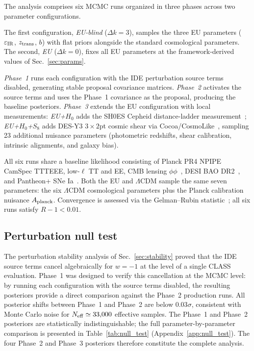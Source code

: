 \documentclass[a4paper,fleqn]{cas-dc}
\newcommand{\ztrans}{z_{\rm trans}}
\begin{document}
The analysis comprises six MCMC runs organized in three
phases across two parameter configurations.

The first configuration, \textit{EU-blind} ($\Delta k = 3$),
samples the three EU parameters
($\varepsilon_{\rm IR}$, $\ztrans$, $b$) with flat priors
alongside the standard cosmological parameters. The second,
\textit{EU} ($\Delta k = 0$), fixes all EU parameters at
the framework-derived values of Sec.~\ref{sec:params}.

\textit{Phase~1} runs each configuration with the IDE
perturbation source terms disabled, generating stable
proposal covariance matrices.
\textit{Phase~2} activates the source terms and uses the
Phase~1 covariance as the proposal, producing the baseline
posteriors.
\textit{Phase~3} extends the EU configuration with local
measurements:
\textit{EU+$H_0$} adds the SH0ES Cepheid distance-ladder
measurement~\cite{breuval2024};
\textit{EU+$H_0$+$S_8$} adds DES-Y3
$3 \times 2$pt cosmic shear via
Cocoa/CosmoLike~\cite{des2022,krause2021}, sampling 23
additional nuisance parameters (photometric redshifts,
shear calibration, intrinsic alignments, and galaxy bias).

All six runs share a baseline likelihood consisting of
Planck PR4 NPIPE CamSpec TTTEEE, low-$\ell$ TT and EE,
CMB lensing
$\phi\phi$~\cite{planck2020npipe}, DESI BAO
DR2~\cite{desi_dr2_2025}, and Pantheon+ SNe
Ia~\cite{scolnic2022}. Both the EU and $\Lambda$CDM
sample the same seven parameters: the six
$\Lambda$CDM cosmological parameters plus the Planck
calibration nuisance $A_{\rm planck}$.
Convergence is assessed via the Gelman--Rubin
statistic~\cite{gelman1992}; all six runs satisfy
$R-1 < 0.01$.

\subsection{Perturbation null test}
\label{sec:pert_null_test}

The perturbation stability analysis of
Sec.~\ref{sec:stability} proved that the IDE source terms
cancel algebraically for $w = -1$ at the level of a single
CLASS evaluation. Phase~1 was designed to verify this
cancellation at the MCMC level: by running each
configuration with the source terms disabled, the
resulting posteriors provide a direct comparison against
the Phase~2 production runs.
All posterior shifts between Phase~1 and Phase~2 are
below $0.03\sigma$, consistent with Monte Carlo noise
for $N_{\rm eff} \simeq 33{,}000$ effective samples.
The Phase~1 and Phase~2 posteriors are statistically
indistinguishable; the full parameter-by-parameter
comparison is presented in
Table~\ref{tab:null_test} (Appendix~\ref{app:null_test}).
The four Phase~2 and Phase~3 posteriors therefore
constitute the complete analysis.
\end{document}
